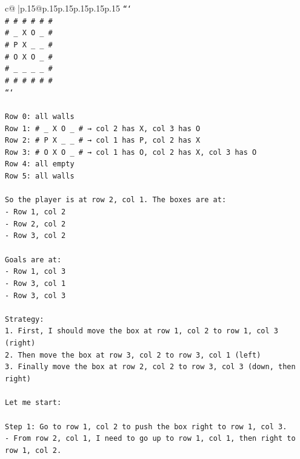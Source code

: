 \documentclass{article}
\begin{document}
{\begin{supertabular}{c@{$\;$}|p{.15\linewidth}@{}p{.15\linewidth}p{.15\linewidth}p{.15\linewidth}p{.15\linewidth}p{.15\linewidth}}
{{{\texttt{```} \\
\texttt{\# \# \# \# \# \#} \\
\texttt{\# \_ X O \_ \#} \\
\texttt{\# P X \_ \_ \#} \\
\texttt{\# O X O \_ \#} \\
\texttt{\# \_ \_ \_ \_ \#} \\
\texttt{\# \# \# \# \# \#} \\
\texttt{```} \\
\\ 
\texttt{Row 0: all walls} \\
\texttt{Row 1: \# \_ X O \_ \# → col 2 has X, col 3 has O} \\
\texttt{Row 2: \# P X \_ \_ \# → col 1 has P, col 2 has X} \\
\texttt{Row 3: \# O X O \_ \# → col 1 has O, col 2 has X, col 3 has O} \\
\texttt{Row 4: all empty} \\
\texttt{Row 5: all walls} \\
\\ 
\texttt{So the player is at row 2, col 1. The boxes are at:} \\
\texttt{{-} Row 1, col 2} \\
\texttt{{-} Row 2, col 2} \\
\texttt{{-} Row 3, col 2} \\
\\ 
\texttt{Goals are at:} \\
\texttt{{-} Row 1, col 3} \\
\texttt{{-} Row 3, col 1} \\
\texttt{{-} Row 3, col 3} \\
\\ 
\texttt{Strategy:} \\
\texttt{1. First, I should move the box at row 1, col 2 to row 1, col 3 (right)} \\
\texttt{2. Then move the box at row 3, col 2 to row 3, col 1 (left)} \\
\texttt{3. Finally move the box at row 2, col 2 to row 3, col 3 (down, then right)} \\
\\ 
\texttt{Let me start:} \\
\\ 
\texttt{Step 1: Go to row 1, col 2 to push the box right to row 1, col 3.} \\
\texttt{{-} From row 2, col 1, I need to go up to row 1, col 1, then right to row 1, col 2.} \\
}}}
\end{supertabular}}
\end{document}

